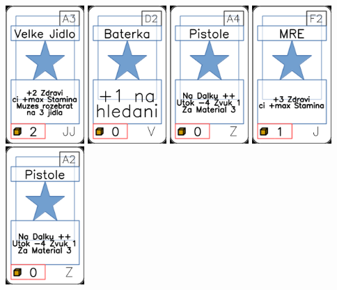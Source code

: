 \documentclass[a4paper]{article}
\begin{document}
	\includegraphics[width=3.0cm]{img-1_32}
	\includegraphics[width=3.0cm]{img-1_76}
	\includegraphics[width=3.0cm]{img-1_93}
	\includegraphics[width=3.0cm]{img-1_26}
	\includegraphics[width=3.0cm]{img-1_91}
\end{document}
